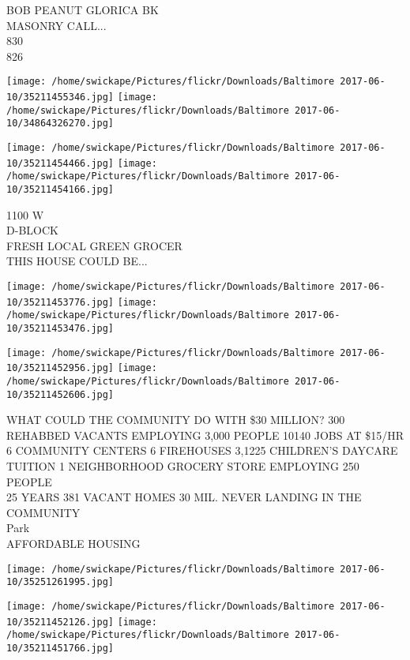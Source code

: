 \documentclass[10pt,letterpaper]{article}
\begin{document}
BOB PEANUT GLORICA BK\\
MASONRY CALL...\\
830\\
826\\
\pagebreak

\texttt{[image: /home/swickape/Pictures/flickr/Downloads/Baltimore 2017-06-10/35211455346.jpg]}
\texttt{[image: /home/swickape/Pictures/flickr/Downloads/Baltimore 2017-06-10/34864326270.jpg]}

\texttt{[image: /home/swickape/Pictures/flickr/Downloads/Baltimore 2017-06-10/35211454466.jpg]}
\texttt{[image: /home/swickape/Pictures/flickr/Downloads/Baltimore 2017-06-10/35211454166.jpg]}

1100 W\\
D{-}BLOCK\\
FRESH LOCAL GREEN GROCER\\
THIS HOUSE COULD BE...\\
\pagebreak

\texttt{[image: /home/swickape/Pictures/flickr/Downloads/Baltimore 2017-06-10/35211453776.jpg]}
\texttt{[image: /home/swickape/Pictures/flickr/Downloads/Baltimore 2017-06-10/35211453476.jpg]}

\texttt{[image: /home/swickape/Pictures/flickr/Downloads/Baltimore 2017-06-10/35211452956.jpg]}
\texttt{[image: /home/swickape/Pictures/flickr/Downloads/Baltimore 2017-06-10/35211452606.jpg]}

WHAT COULD THE COMMUNITY DO WITH \$30 MILLION?  300 REHABBED VACANTS EMPLOYING 3,000 PEOPLE 10140 JOBS AT \$15/HR 6 COMMUNITY CENTERS 6 FIREHOUSES 3,1225 CHILDREN'S DAYCARE TUITION 1 NEIGHBORHOOD GROCERY STORE EMPLOYING 250 PEOPLE\\
25 YEARS 381 VACANT HOMES 30 MIL. NEVER LANDING IN THE COMMUNITY\\
Park\\
AFFORDABLE HOUSING\\
\pagebreak

\texttt{[image: /home/swickape/Pictures/flickr/Downloads/Baltimore 2017-06-10/35251261995.jpg]}

\vspace{0.25in}
\texttt{[image: /home/swickape/Pictures/flickr/Downloads/Baltimore 2017-06-10/35211452126.jpg]}
\texttt{[image: /home/swickape/Pictures/flickr/Downloads/Baltimore 2017-06-10/35211451766.jpg]}
\end{document}
